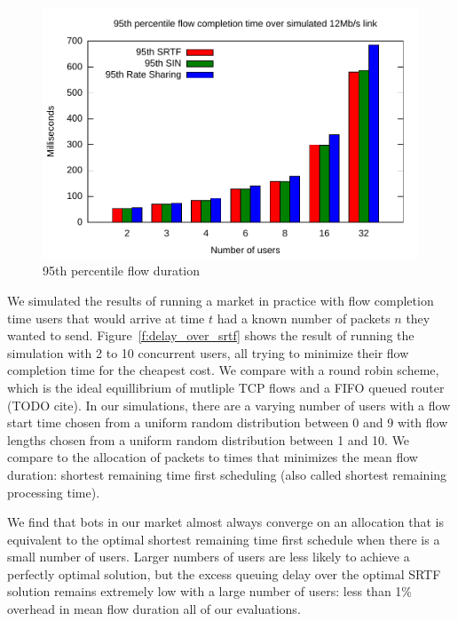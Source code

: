 \begin{figure}
\includegraphics[width=\columnwidth]{plots/95th_delay_over_srtf.pdf}
\caption{95th percentile flow duration}
\label{f:95th_delay_over_srtf}
\end{figure}

We simulated the results of running a market in practice with flow completion time users that would arrive at time $t$ had a known number of packets $n$ they wanted to send.
Figure~\ref{f:delay_over_srtf} shows the result of running the simulation with 2 to 10 concurrent users, all trying to minimize their flow completion time for the cheapest cost.
We compare with a round robin scheme, which is the ideal equillibrium of mutliple TCP flows and a FIFO queued router (TODO cite).
In our simulations, there are a varying number of users with a flow start time chosen from a uniform random distribution between 0 and 9 with flow lengths chosen from a uniform random distribution between 1 and 10. We compare to the allocation of packets to times that minimizes the mean flow duration: shortest remaining time first scheduling \cite{karger10,bansal01} (also called shortest remaining processing time).

We find that bots in our market almost always converge on an allocation that is equivalent to the optimal shortest remaining time first schedule when there is a small number of users. Larger numbers of users are less likely to achieve a perfectly optimal solution, but the excess queuing delay over the optimal SRTF solution remains extremely low with a large number of users: less than 1\% overhead in mean flow duration all of our evaluations.

